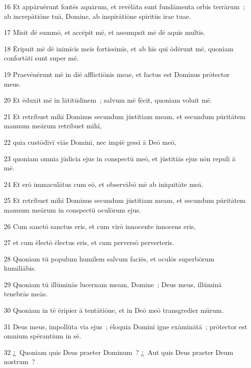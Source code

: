 \psalmVerse
  {\phantom{0}16}
  {Et appāruērunt fontēs aquārum, et revēlāta sunt fundāmenta orbis terrārum~; ab increpātiōne tuā, Domine, ab inspīrātiōne spīritūs īrae tuae.}


\psalmVerse
  {\phantom{0}17}
  {Mīsit dē summō, et accēpit mē, et assumpsit mē dē aquīs multīs.}


\psalmVerse
  {\phantom{0}18}
  {Ēripuit mē dē inimīcīs meīs fortissimīs, et ab hīs quī ōdērunt mē, quoniam confortātī sunt super mē.}


\psalmVerse
  {\phantom{0}19}
  {Praevēnērunt mē in diē afflictiōnis meae, et factus est Dominus prōtector meus.}


\psalmVerse
  {\phantom{0}20}
  {Et ēduxit mē in lātitūdinem~; salvum mē fēcit, quoniam voluit mē.}


\psalmVerse
  {\phantom{0}21}
  {Et retribuet mihī Dominus secundum jūstitiam meam, et secundum pūritātem manuum meārum retribuet mihī,}


\psalmVerse
  {\phantom{0}22}
  {quia custōdīvī viās Dominī, nec impiē gessī ā Deō meō,}


\psalmVerse
  {\phantom{0}23}
  {quoniam omnia jūdicia ejus in conspectū meō, et jūstitiās ejus nōn repulī ā mē.}


\psalmVerse
  {\phantom{0}24}
  {Et erō immaculātus cum eō, et observābō mē ab inīquitāte meā.}


\psalmVerse
  {\phantom{0}25}
  {Et retribuet mihī Dominus secundum jūstitiam meam, et secundum pūritātem manuum meārum in conspectū oculōrum ejus.}


\psalmVerse
  {\phantom{0}26}
  {Cum sanctō sanctus eris, et cum virō innocente innocens eris,}


\psalmVerse
  {\phantom{0}27}
  {et cum ēlectō ēlectus eris, et cum perversō perverteris.}


\psalmVerse
  {\phantom{0}28}
  {Quoniam tū populum humilem salvum faciēs, et oculōs superbōrum humiliābis.}


\psalmVerse
  {\phantom{0}29}
  {Quoniam tū illūminās lucernam meam, Domine~; Deus meus, illūminā tenebrās meās.}


\psalmVerse
  {\phantom{0}30}
  {Quoniam in tē ēripier ā tentātiōne, et in Deō meō transgredier mūrum.}


\psalmVerse
  {\phantom{0}31}
  {Deus meus, impollūta via ejus~; ēloquia Dominī igne exāminātā~; prōtector est omnium spērantium in sē.}


\psalmVerse
  {\phantom{0}32}
  {¿~Quoniam quis Deus praeter Dominum~? ¿~Aut quis Deus praeter Deum nostrum~?}


